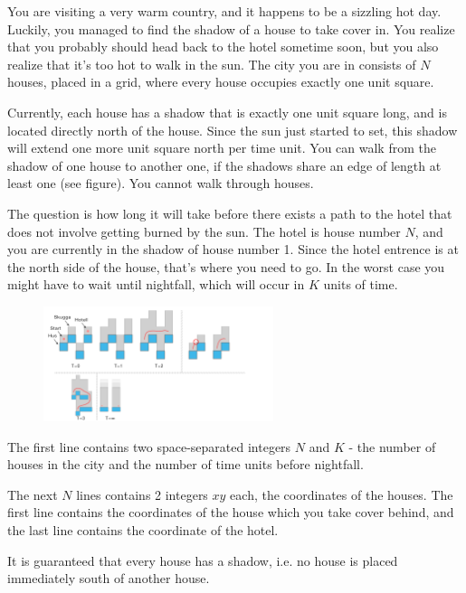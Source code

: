 
You are visiting a very warm country, and it happens to be a sizzling hot day. Luckily, you managed to find the shadow of a house to take cover in. You realize that you probably should head back to the hotel sometime soon, but you also realize that it's too hot to walk in the sun. The city you are in consists of $N$ houses, placed in a grid, where every house occupies exactly one unit square.

Currently, each house has a shadow that is exactly one unit square long, and is located directly north of the house. Since the sun just started to set, this shadow will extend one more unit square north per time unit. You can walk from the shadow of one house to another one, if the shadows share an edge of length at least one (see figure). You cannot walk through houses.

The question is how long it will take before there exists a path to the hotel that does not involve getting burned by the sun. The hotel is house number $N$, and you are currently in the shadow of house number 1. Since the hotel entrence is at the north side of the house, that's where you need to go. In the worst case you might have to wait until nightfall, which will occur in $K$ units of time.

\begin{figure}[ht!]
\centering
\includegraphics[width=0.6\textwidth]{skuggor.png}
\label{overflow}
\end{figure}

The first line contains two space-separated integers $N$ and $K$ - the number of houses in the city and the number of time units before nightfall.

The next $N$ lines contains 2 integers $x y$ each, the coordinates of the houses. The first line contains the coordinates of the house which you take cover behind, and the last line contains the coordinate of the hotel.

It is guaranteed that every house has a shadow, i.e. no house is placed immediately south of another house.

